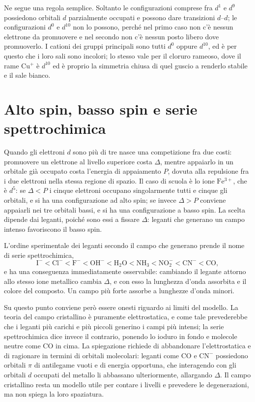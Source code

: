 Ne segue una regola semplice.
Soltanto le configurazioni comprese fra $d^1$ e $d^9$ possiedono orbitali $d$ parzialmente occupati e possono dare transizioni $d$--$d$; le configurazioni $d^0$ e $d^{10}$ non lo possono, perché nel primo caso non c'è nessun elettrone da promuovere e nel secondo non c'è nessun posto libero dove promuoverlo.
I cationi dei gruppi principali sono tutti $d^0$ oppure $d^{10}$, ed è per questo che i loro sali sono incolori; lo stesso vale per il cloruro rameoso, dove il rame $\mathrm{Cu^+}$ è $d^{10}$ ed è proprio la simmetria chiusa di quel guscio a renderlo stabile e il sale bianco.

\section{Alto spin, basso spin e serie spettrochimica}

Quando gli elettroni $d$ sono più di tre nasce una competizione fra due costi: promuovere un elettrone al livello superiore costa $\Delta$, mentre appaiarlo in un orbitale già occupato costa l'energia di appaiamento $P$, dovuta alla repulsione fra i due elettroni nella stessa regione di spazio.
Il caso di scuola è lo ione $\mathrm{Fe^{3+}}$, che è $d^5$: se $\Delta < P$ i cinque elettroni occupano singolarmente tutti e cinque gli orbitali, e si ha una configurazione ad alto spin; se invece $\Delta > P$ conviene appaiarli nei tre orbitali bassi, e si ha una configurazione a basso spin.
La scelta dipende dai leganti, poiché sono essi a fissare $\Delta$: leganti che generano un campo intenso favoriscono il basso spin.

L'ordine sperimentale dei leganti secondo il campo che generano prende il nome di serie spettrochimica,
\[
    \mathrm{I^-} < \mathrm{Cl^-} < \mathrm{F^-} < \mathrm{OH^-} < \mathrm{H_2O} < \mathrm{NH_3} < \mathrm{NO_2^-} < \mathrm{CN^-} < \mathrm{CO} ,
\]
e ha una conseguenza immediatamente osservabile: cambiando il legante attorno allo stesso ione metallico cambia $\Delta$, e con esso la lunghezza d'onda assorbita e il colore del composto.
Un campo più forte assorbe a lunghezze d'onda minori.

Su questo punto conviene però essere onesti riguardo ai limiti del modello.
La teoria del campo cristallino è puramente elettrostatica, e come tale prevederebbe che i leganti più carichi e più piccoli generino i campi più intensi; la serie spettrochimica dice invece il contrario, ponendo lo ioduro in fondo e molecole neutre come $\mathrm{CO}$ in cima.
La spiegazione richiede di abbandonare l'elettrostatica e di ragionare in termini di orbitali molecolari: leganti come $\mathrm{CO}$ e $\mathrm{CN^-}$ possiedono orbitali $\pi$ di antilegame vuoti e di energia opportuna, che interagendo con gli orbitali $d$ occupati del metallo li abbassano ulteriormente, allargando $\Delta$.
Il campo cristallino resta un modello utile per contare i livelli e prevedere le degenerazioni, ma non spiega la loro spaziatura.

